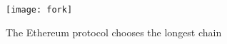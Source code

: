 \begin{figure}[H]
    \centering
    \texttt{[image: fork]}
    \caption{The Ethereum protocol chooses the longest chain~\cite{preethi}}
    \label{fig:forking}
\end{figure}